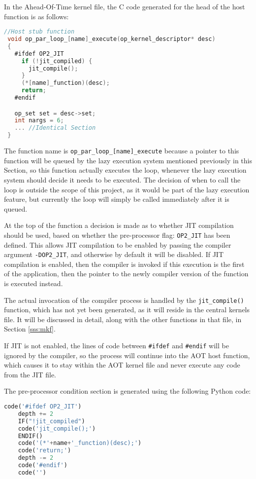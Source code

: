 In the Ahead-Of-Time kernel file, the C code generated for the head of the host function is as follows:

\begin{lstlisting}[linewidth = \textwidth, framesep=0pt, language=C, linebackgroundcolor={\ifnum\value{lstnumber}<15 \ifnum\value{lstnumber}>10 \color{red!20} \else \color{blue!20} \fi \else \color{blue!20} \fi}]
 //Host stub function
 void op_par_loop_[name]_execute(op_kernel_descriptor* desc)
 {
   #ifdef OP2_JIT
     if (!jit_compiled) {
       jit_compile();
     }
     (*[name]_function)(desc);
     return;
   #endif

   op_set set = desc->set;
   int nargs = 6;
   ... //Identical Section
 }
\end{lstlisting}


The function name is \verb|op_par_loop_[name]_execute| because a pointer to this function will be queued by the lazy execution system mentioned previously in this Section, so this function actually executes the loop, whenever the lazy execution system should decide it needs to be executed. The decision of when to call the loop is outside the scope of this project, as it would be part of the lazy execution feature, but currently the loop will simply be called immediately after it is queued.
\par At the top of the function a decision is made as to whether JIT compilation should be used, based on whether the pre-processor flag: \verb|OP2_JIT| has been defined. This allows JIT compilation to be enabled by passing the compiler argument \verb|-DOP2_JIT|, and otherwise by default it will be disabled. If JIT compilation is enabled, then the compiler is invoked if this execution is the first of the application, then the pointer to the newly compiler version of the function is executed instead.
\par
The actual invocation of the compiler process is handled by the \verb|jit_compile()| function, which has not yet been generated, as it will reside in the central kernels file. It will be discussed in detail, along with the other functions in that file, in Section \ref{sss:mkf}.
\par
If JIT is not enabled, the lines of code between \verb|#ifdef| and \verb|#endif| will be ignored by the compiler, so the process will continue into the AOT host function, which causes it to stay within the AOT kernel file and never execute any code from the JIT file.
\par
The pre-processor condition section is generated using the following Python code:
\begin{lstlisting}[backgroundcolor=\color{lightgray!20}, language=Python]
    code('#ifdef OP2_JIT')
    depth += 2
    IF("!jit_compiled")
    code('jit_compile();')
    ENDIF()
    code('(*'+name+'_function)(desc);')
    code('return;')
    depth -= 2
    code('#endif')
    code('')
\end{lstlisting}



